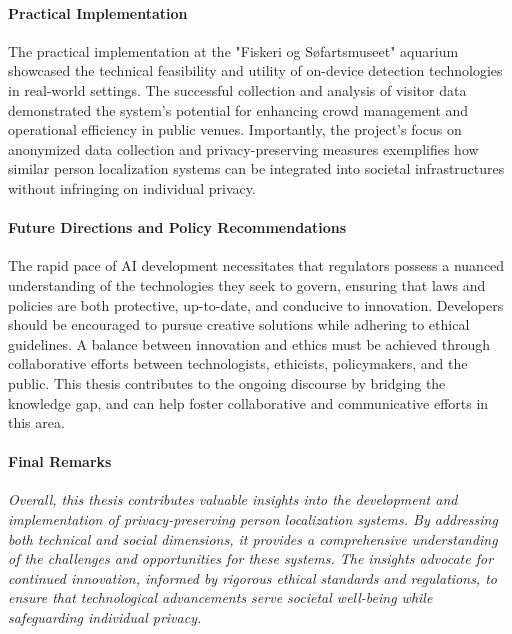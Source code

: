\paragraph{Practical Implementation}
The practical implementation at the "Fiskeri og Søfartsmuseet" aquarium showcased the technical feasibility and utility of on-device detection technologies in real-world settings. The successful collection and analysis of visitor data demonstrated the system's potential for enhancing crowd management and operational efficiency in public venues. Importantly, the project's focus on anonymized data collection and privacy-preserving measures exemplifies how similar person localization systems can be integrated into societal infrastructures without infringing on individual privacy.

\paragraph{Future Directions and Policy Recommendations}
The rapid pace of AI development necessitates that regulators possess a nuanced understanding of the technologies they seek to govern, ensuring that laws and policies are both protective, up-to-date, and conducive to innovation. Developers should be encouraged to pursue creative solutions while adhering to ethical guidelines. A balance between innovation and ethics must be achieved through collaborative efforts between technologists, ethicists, policymakers, and the public. This thesis contributes to the ongoing discourse by bridging the knowledge gap, and can help foster collaborative and communicative efforts in this area.

\paragraph{Final Remarks}
\textit{Overall, this thesis contributes valuable insights into the development and implementation of privacy-preserving person localization systems. By addressing both technical and social dimensions, it provides a comprehensive understanding of the challenges and opportunities for these systems. The insights advocate for continued innovation, informed by rigorous ethical standards and regulations, to ensure that technological advancements serve societal well-being while safeguarding individual privacy.}